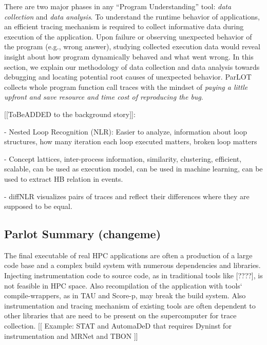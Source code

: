 There are two major phases in any ``Program Understanding'' tool: \textit{data collection} and \textit{data analysis}.
%
To understand the runtime behavior of applications, an efficient tracing mechanism is required to collect informative data during execution of the application.
%
Upon failure or observing unexpected behavior of the program (e.g., wrong answer), studying collected execution data would reveal insight about how program dynamically behaved and what went wrong.
%
In this section, we explain our methodology of data collection and data analysis towards debugging and locating potential root causes of unexpected behavior.
%
ParLOT collects whole program function call traces with the mindset of \textit{paying a little upfront and save resource and time cost of reproducing the bug}.

[[ToBeADDED to the background story]]:

- Nested Loop Recognition (NLR): Easier to analyze, information about loop structures, how many iteration each loop executed matters, broken loop matters

- Concept lattices, inter-process information, similarity, clustering, efficient, scalable, can be used as execution model, can be used in machine learning, can be used to extract HB relation in events.

- diffNLR visualizes pairs of traces and reflect their differences where they are supposed to be equal. 



\subsection{Parlot Summary (changeme)}
The final executable of real HPC applications are often a production of a large code base and a complex build system with numerous dependencies and libraries. Injecting instrumentation code to source code, as in traditional tools like [????], is not feasible in HPC space. Also recompilation of the application with tools` compile-wrappers, as in TAU\cite{tau} and Score-p\cite{scorep}, may break the build system. 
Also instrumentation and tracing mechanism of existing tools are often dependent to other libraries that are need to be present on the supercomputer for trace collection. [[ Example: STAT\cite{stat} and AutomaDeD\cite{automaded-laguna} that requires Dyninst\cite{dyninst} for instrumentation and MRNet\cite{mrnet} and TBON \cite{tbon}]]

